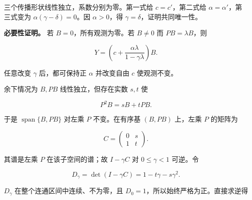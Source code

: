 \documentclass[11pt,a4paper]{article}
\begin{document}
三个传播形状线性独立，系数分别为零。第一式给 \(c=c'\)，第二式给
\(\alpha=\alpha'\)，第三式变为 \(\alpha(\gamma-\delta)=0\)。因
\(\alpha>0\)，得 \(\gamma=\delta\)，证明共同唯一性。

\par
\noindent\begin{minipage}{\linewidth}

\textbf{必要性证明。} 若 \(B=0\)，所有观测为零。若 \(B\ne0\) 而
\(PB=\lambda B\)，则

\[
Y=\left(c+\frac{\alpha\lambda}{1-\gamma\lambda}\right)B.
\]

\end{minipage}\par

任意改变 \(\gamma\) 后，都可保持正 \(\alpha\) 并改变自由 \(c\)
使观测不变。

\par
\noindent\begin{minipage}{\linewidth}

余下情况为 \(B,PB\) 线性独立，但存在实数 \(s,t\) 使

\[
P^2B=sB+tPB.
\]

\end{minipage}\par

\par
\noindent\begin{minipage}{\linewidth}

于是 \(\operatorname{span}\{B,PB\}\) 对左乘 \(P\) 不变。在有序基
\((B,PB)\) 上，左乘 \(P\) 的矩阵为

\[
C=\begin{pmatrix}0&s\\1&t\end{pmatrix}.
\]

\end{minipage}\par

\par
\noindent\begin{minipage}{\linewidth}

其谱是左乘 \(P\) 在该子空间的谱；故 \(I-\gamma C\) 对 \(0\le\gamma<1\)
可逆。令

\[
D_\gamma=\det(I-\gamma C)=1-t\gamma-s\gamma^2.
\]

\end{minipage}\par

\(D_\gamma\) 在整个连通区间中连续、不为零，且
\(D_0=1\)，所以始终严格为正。直接求逆得
\end{document}
